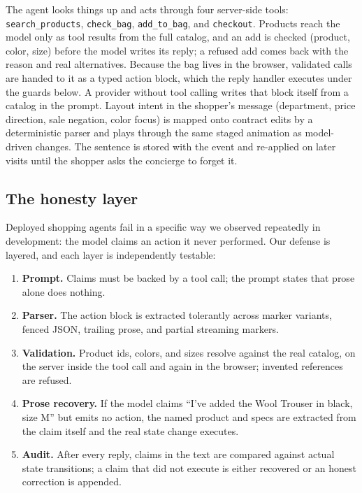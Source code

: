\documentclass[sigconf, screen, review]{acmart}
\begin{document}
The agent looks things up and acts through four server-side tools: \texttt{search\_products}, \texttt{check\_bag}, \texttt{add\_to\_bag}, and \texttt{checkout}. Products reach the model only as tool results from the full catalog, and an add is checked (product, color, size) before the model writes its reply; a refused add comes back with the reason and real alternatives. Because the bag lives in the browser, validated calls are handed to it as a typed action block, which the reply handler executes under the guards below. A provider without tool calling writes that block itself from a catalog in the prompt. Layout intent in the shopper's message (department, price direction, sale negation, color focus) is mapped onto contract edits by a deterministic parser and plays through the same staged animation as model-driven changes. The sentence is stored with the event and re-applied on later visits until the shopper asks the concierge to forget it.


\subsection{The honesty layer}

Deployed shopping agents fail in a specific way we observed repeatedly in development: the model claims an action it never performed. Our defense is layered, and each layer is independently testable:

\begin{enumerate}
  \item \textbf{Prompt.} Claims must be backed by a tool call; the prompt states that prose alone does nothing.
  \item \textbf{Parser.} The action block is extracted tolerantly across marker variants, fenced JSON, trailing prose, and partial streaming markers.
  \item \textbf{Validation.} Product ids, colors, and sizes resolve against the real catalog, on the server inside the tool call and again in the browser; invented references are refused.
  \item \textbf{Prose recovery.} If the model claims ``I've added the Wool Trouser in black, size M'' but emits no action, the named product and specs are extracted from the claim itself and the real state change executes.
  \item \textbf{Audit.} After every reply, claims in the text are compared against actual state transitions; a claim that did not execute is either recovered or an honest correction is appended.
\end{enumerate}
\end{document}
